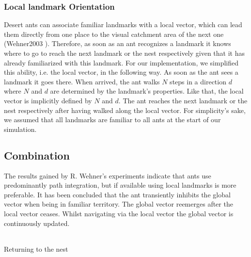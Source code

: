 \documentclass[11pt]{article}
\begin{document}
\subsubsection{Local landmark Orientation}
Desert ants can associate familiar landmarks with a local vector, which can lead them directly from one place to the visual catchment area of the next one (Wehner2003 \cite{Wehner2003}). Therefore, as soon as an ant recognizes a landmark it knows where to go to reach the next landmark or the nest respectively given that it has already familiarized with this landmark.  
For our implementation, we simplified this ability, i.e. the local vector, in the following way. 
As soon as the ant sees a landmark it goes there. When arrived, the ant walks $N$ steps in a direction $d$ where $N$ and $d$ are determined by the landmark’s properties. Like that, the local vector is implicitly defined by $N$ and $d$. The ant reaches the next landmark or the nest respectively after having walked along the local vector. 
For simplicity’s sake, we assumed that all landmarks are familiar to all ants at the start of our simulation.





\subsection{Combination} \label{Sec:Combination}
The results gained by R. Wehner's experiments indicate that ants use predominantly path integration, but if available using local landmarks is more preferable. It has been concluded that the ant transiently inhibits the global vector when being in familiar territory. The global vector reemerges after the local vector ceases. Whilst navigating via the local vector the global vector is continuously updated.
\\ \

\begin{algorithm}[H]

\caption{Returning to the nest}
\end{algorithm}
\end{document}
